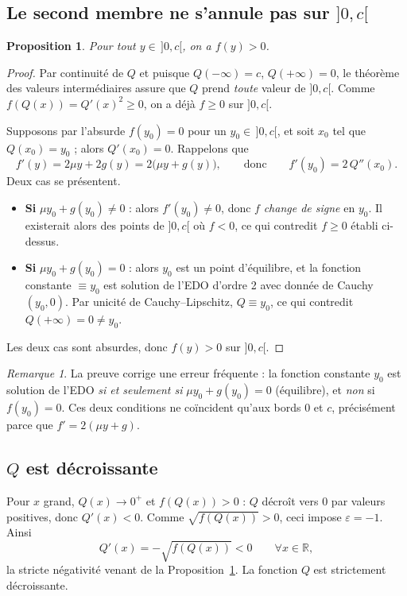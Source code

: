\documentclass[11pt,a4paper]{article}
\theoremstyle{plain}
\newtheorem{proposition}{Proposition}
\theoremstyle{remark}
\newtheorem*{remarque}{Remarque}
\newcommand{\R}{\mathbb{R}}
\newcommand{\eps}{\varepsilon}
\begin{document}
\subsection{Le second membre ne s'annule pas sur $]0,c[$}
\begin{proposition}\label{prop:fpos}
Pour tout $y\in\,]0,c[$, on a $f(y)>0$.
\end{proposition}

\begin{proof}
Par continuité de $Q$ et puisque $Q(-\infty)=c$, $Q(+\infty)=0$, le théorème des
valeurs intermédiaires assure que $Q$ prend \emph{toute} valeur de $]0,c[$.
Comme $f(Q(x))=Q'(x)^2\ge0$, on a déjà $f\ge0$ sur $]0,c[$.

Supposons par l'absurde $f(y_0)=0$ pour un $y_0\in\,]0,c[$, et soit $x_0$ tel que
$Q(x_0)=y_0$ ; alors $Q'(x_0)=0$. Rappelons que
\[
  f'(y)=2\mu y+2g(y)=2\big(\mu y+g(y)\big),
  \qquad\text{donc}\qquad f'(y_0)=2\,Q''(x_0).
\]
Deux cas se présentent.
\begin{itemize}[leftmargin=1.6em]
  \item \textbf{Si} $\mu y_0+g(y_0)\neq0$ : alors $f'(y_0)\neq0$, donc $f$
  \emph{change de signe} en $y_0$. Il existerait alors des points de $]0,c[$ où
  $f<0$, ce qui contredit $f\ge0$ établi ci-dessus.
  \item \textbf{Si} $\mu y_0+g(y_0)=0$ : alors $y_0$ est un point d'équilibre, et
  la fonction constante $\equiv y_0$ est solution de l'EDO d'ordre 2 avec donnée
  de Cauchy $(y_0,0)$. Par unicité de Cauchy–Lipschitz, $Q\equiv y_0$, ce qui
  contredit $Q(+\infty)=0\neq y_0$.
\end{itemize}
Les deux cas sont absurdes, donc $f(y)>0$ sur $]0,c[$.
\end{proof}

\begin{remarque}
La preuve corrige une erreur fréquente : la fonction constante $y_0$ est solution
de l'EDO \emph{si et seulement si} $\mu y_0+g(y_0)=0$ (équilibre), et \emph{non}
si $f(y_0)=0$. Ces deux conditions ne coïncident qu'aux bords $0$ et $c$,
précisément parce que $f'=2(\mu y+g)$.
\end{remarque}

\subsection{$Q$ est décroissante}
Pour $x$ grand, $Q(x)\to0^+$ et $f(Q(x))>0$ : $Q$ décroît vers $0$ par valeurs
positives, donc $Q'(x)<0$. Comme $\sqrt{f(Q(x))}>0$, ceci impose $\eps=-1$. Ainsi
\[
  Q'(x)=-\sqrt{f(Q(x))}<0\qquad\forall x\in\R,
\]
la stricte négativité venant de la Proposition~\ref{prop:fpos}. La fonction $Q$
est strictement décroissante.
\end{document}
